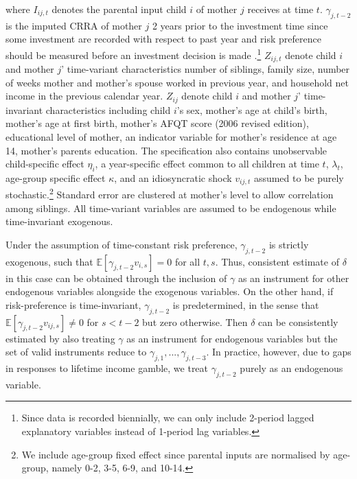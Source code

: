 \documentclass[]{article}
\begin{document}
where $I_{ij,t}$ denotes the parental input child $i$ of mother $j$ receives at time $t$. $\gamma_{j,t-2}$ is the imputed CRRA of mother $j$ 2 years prior to the investment time since some investment are recorded with respect to past year and risk preference should be measured before an investment decision is made \citet{hartog2002linking}.\footnote{Since data is recorded biennially, we can only include 2-period lagged explanatory variables instead of 1-period lag variables.} $Z_{ij,t}$ denote child $i$ and mother $j$' time-variant characteristics number of siblings, family size, number of weeks mother and mother's spouse worked in previous year, and household net income in the previous calendar year. $Z_{ij}$ denote child $i$ and mother $j$' time-invariant characteristics including child $i$'s sex, mother's age at child's birth, mother's age at first birth, mother's AFQT score (2006 revised edition), educational level of mother, an indicator variable for mother's residence at age 14, mother's parents education. The specification also contains unobservable child-specific effect $\eta_i$, a year-specific effect common to all children at time $t$, $\lambda_t$, age-group specific effect $\kappa$, and an idiosyncratic shock $v_{ij,t}$ assumed to be purely stochastic.\footnote{We include age-group fixed effect since parental inputs are normalised by age-group, namely 0-2, 3-5, 6-9, and 10-14.} Standard error are clustered at mother's level to allow correlation among siblings. All time-variant variables are assumed to be endogenous while time-invariant exogenous.

Under the assumption of time-constant risk preference, $\gamma_{j,t-2}$ is strictly exogenous, such that $\mathbb E[\gamma_{j,t-2}v_{i,s}]=0$ for all $t,s$. Thus, consistent estimate of $\delta$ in this case can be obtained through the inclusion of $\gamma$ as an instrument for other endogenous variables alongside the exogenous variables. On the other hand, if risk-preference is time-invariant, $\gamma_{j,t-2}$ is predetermined, in the sense that $\mathbb E[\gamma_{j,t-2}v_{ij,s}]\ne 0$ for $s<t-2$ but zero otherwise. \alert{Then $\delta$ can be consistently estimated by also treating $\gamma$ as an instrument for endogenous variables but the set of valid instruments reduce to $\gamma_{j,1},...,\gamma_{j,t-3}$.} In practice, however, due to gaps in responses to lifetime income gamble, we treat $\gamma_{j,t-2}$ purely as an endogenous variable.
\end{document}

